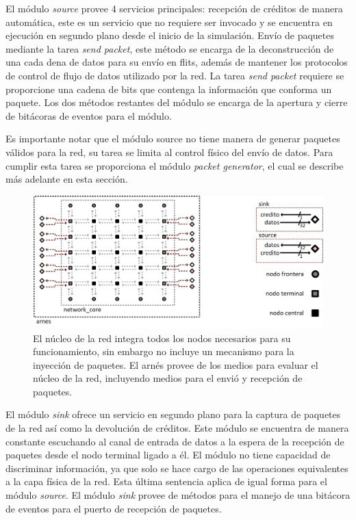 El módulo \textit{source} provee 4 servicios principales: recepción de créditos de manera automática, este es un servicio que no requiere ser invocado y se encuentra en ejecución en segundo plano desde el inicio de la simulación. Envío de paquetes mediante la tarea \textit{send packet}, este método se encarga de la deconstrucción de una cada dena de datos para su envío en flits, además de mantener los protocolos de control de flujo de datos utilizado por la red. La tarea \textit{send packet} requiere se proporcione una cadena de bits que contenga la información que conforma un paquete. Los dos métodos restantes del módulo se encarga de la apertura y cierre de bitácoras de eventos para el módulo.

Es importante notar que el módulo source no tiene manera de generar paquetes válidos para la red, su tarea se limita al control físico del envío de datos. Para cumplir esta tarea se proporciona el módulo \textit{packet generator}, el cual se describe más adelante en esta sección.

\begin{figure}
	\begin{center}
		\includegraphics[scale=0.75]{figures/ch5_organizacion_validacion.png}
	\end{center}
	\caption
		{	
			El núcleo de la red integra todos los nodos necesarios para su funcionamiento, sin embargo no incluye un mecanismo para la inyección de paquetes. El arnés provee de los medios para evaluar el núcleo de la red, incluyendo medios para el envió y recepción de paquetes.
		}
	\label{fig:ch5_organizacion_validacion}
\end{figure}

El módulo \textit{sink} ofrece un servicio en segundo plano para la captura de paquetes de la red así como la devolución de créditos. Este módulo se encuentra de manera constante escuchando al canal de entrada de datos a la espera de la recepción de paquetes desde el nodo terminal ligado a él. El módulo no tiene capacidad de discriminar información, ya que solo se hace cargo de las operaciones equivalentes a la capa física de la red. Esta última sentencia aplica de igual forma para el módulo \textit{source}. El módulo \textit{sink} provee de métodos para el manejo de una bitácora de eventos para el puerto de recepción de paquetes.

